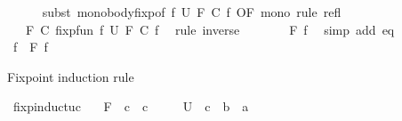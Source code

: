 \begin{isabellebody}
\ \ \ \ \isamarkupfalse%
\ {\isacharparenleft}{\kern0pt}subst\ mono{\isacharunderscore}{\kern0pt}body{\isacharunderscore}{\kern0pt}fixp{\isacharbrackleft}{\kern0pt}of\ {\isachardoublequoteopen}{\isacharpercent}{\kern0pt}f{\isachardot}{\kern0pt}\ U\ {\isacharparenleft}{\kern0pt}F\ {\isacharparenleft}{\kern0pt}C\ f{\isacharparenright}{\kern0pt}{\isacharparenright}{\kern0pt}{\isachardoublequoteclose}{\isacharcomma}{\kern0pt}\ OF\ mono{\isacharbrackright}{\kern0pt}{\isacharparenright}{\kern0pt}\ {\isacharparenleft}{\kern0pt}rule\ refl{\isacharparenright}{\kern0pt}\isanewline
\ \ \isamarkupfalse%
\ \isamarkupfalse%
\ {\isachardoublequoteopen}{\isachardot}{\kern0pt}{\isachardot}{\kern0pt}{\isachardot}{\kern0pt}\ {\isacharequal}{\kern0pt}\ F\ {\isacharparenleft}{\kern0pt}C\ {\isacharparenleft}{\kern0pt}fixp{\isacharunderscore}{\kern0pt}fun\ {\isacharparenleft}{\kern0pt}{\isasymlambda}f{\isachardot}{\kern0pt}\ U\ {\isacharparenleft}{\kern0pt}F\ {\isacharparenleft}{\kern0pt}C\ f{\isacharparenright}{\kern0pt}{\isacharparenright}{\kern0pt}{\isacharparenright}{\kern0pt}{\isacharparenright}{\kern0pt}{\isacharparenright}{\kern0pt}{\isachardoublequoteclose}\ \isamarkupfalse%
\ {\isacharparenleft}{\kern0pt}rule\ inverse{\isacharparenright}{\kern0pt}\isanewline
\ \ \isamarkupfalse%
\ \isamarkupfalse%
\ {\isachardoublequoteopen}{\isachardot}{\kern0pt}{\isachardot}{\kern0pt}{\isachardot}{\kern0pt}\ {\isacharequal}{\kern0pt}\ F\ f{\isachardoublequoteclose}\ \isamarkupfalse%
\ {\isacharparenleft}{\kern0pt}simp\ add{\isacharcolon}{\kern0pt}\ eq{\isacharparenright}{\kern0pt}\isanewline
\ \ \isamarkupfalse%
\ \isamarkupfalse%
\ {\isachardoublequoteopen}f\ {\isacharequal}{\kern0pt}\ F\ f{\isachardoublequoteclose}\ \isacommand{{\isachardot}{\kern0pt}}\isamarkupfalse%
\isanewline
{}\isamarkupfalse%
%
\endisatagproof
{\isafoldproof}%
%
\isadelimproof
%
\endisadelimproof
%
\begin{isamarkuptext}%
Fixpoint induction rule%
\end{isamarkuptext}\isamarkuptrue%
\isamarkupfalse%
\ fixp{\isacharunderscore}{\kern0pt}induct{\isacharunderscore}{\kern0pt}uc{\isacharcolon}{\kern0pt}\isanewline
\ \ \ F\ {\isacharcolon}{\kern0pt}{\isacharcolon}{\kern0pt}\ {\isachardoublequoteopen}{\isacharprime}{\kern0pt}c\ {\isasymRightarrow}\ {\isacharprime}{\kern0pt}c{\isachardoublequoteclose}\isanewline
\ \ \ \ \ U\ {\isacharcolon}{\kern0pt}{\isacharcolon}{\kern0pt}\ {\isachardoublequoteopen}{\isacharprime}{\kern0pt}c\ {\isasymRightarrow}\ {\isacharprime}{\kern0pt}b\ {\isasymRightarrow}\ {\isacharprime}{\kern0pt}a{\isachardoublequoteclose}\isanewline

\end{isabellebody}
